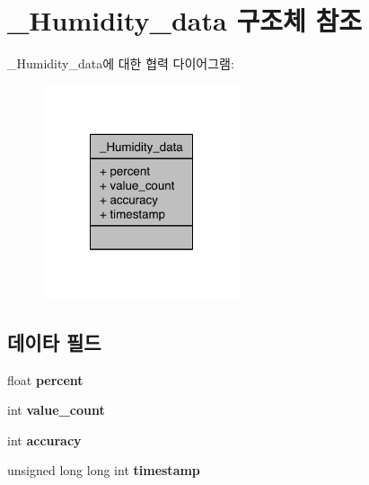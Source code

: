\hypertarget{struct___humidity__data}{\section{\-\_\-\-Humidity\-\_\-data 구조체 참조}
\label{struct___humidity__data}
}


\-\_\-\-Humidity\-\_\-data에 대한 협력 다이어그램\-:\nopagebreak
\begin{figure}[H]
\begin{center}
\leavevmode
\includegraphics[width=164pt]{d9/d6f/struct___humidity__data__coll__graph}
\end{center}
\end{figure}
\subsection*{데이타 필드}
\begin{DoxyCompactItemize}
\item 
\hypertarget{struct___humidity__data_aac167f3972a2f244f4b32c8ee5b89364}{float {\bfseries percent}}\label{struct___humidity__data_aac167f3972a2f244f4b32c8ee5b89364}

\item 
\hypertarget{struct___humidity__data_a40a079bfc72408819dc78da308203a74}{int {\bfseries value\-\_\-count}}\label{struct___humidity__data_a40a079bfc72408819dc78da308203a74}

\item 
\hypertarget{struct___humidity__data_a5565cf9073275f9713f9016e7c10d25f}{int {\bfseries accuracy}}\label{struct___humidity__data_a5565cf9073275f9713f9016e7c10d25f}

\item 
\hypertarget{struct___humidity__data_a8de02c4128636a7bf630ff5428f60c8d}{unsigned long long int {\bfseries timestamp}}\label{struct___humidity__data_a8de02c4128636a7bf630ff5428f60c8d}

\end{DoxyCompactItemize}


